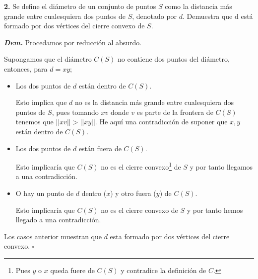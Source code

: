 \textbf{2.} Se define el diámetro de un conjunto de puntos $S$ como la distancia más grande
entre cualesquiera dos puntos de $S$, denotado por $d$. Demuestra que d está formado por dos
vértices del cierre convexo de $S$. \newline

\textbf{\textit{Dem.}} Procedamos por reducción al absurdo. \newline

Supongamos que el diámetro $C(S)$ no contiene dos puntos del diámetro, entonces, para $d = xy$;
\begin{itemize}
        \item Los dos puntos de $d$ están dentro de $C(S)$.
              
              Esto implica que $d$ no es la distancia más grande entre cualesquiera dos puntos
              de $S$, pues tomando $xv$ donde $v$ es parte de la frontera de $C(S)$ tenemos que
              $||xv|| > ||xy||$. He aquí una contradicción de suponer que $x, y$ están dentro de
              $C(S)$.
        \item Los dos puntos de $d$ están fuera de $C(S)$.
              
              Esto implicaría que $C(S)$ no es el cierre convexo\footnote{Pues $y$ o $x$ queda fuere de $C(S)$ y
              contradice la definición de $C$.} de $S$ y por tanto llegamos a una contradicción.
        \item O hay un punto de $d$ dentro ($x$) y otro fuera ($y$) de $C(S)$.
              
              Esto implicaría que $C(S)$ no es el cierre convexo de $S$ y por tanto hemos llegado a una contradicción.
\end{itemize}
Los casos anterior muestran que $d$ esta formado por dos vértices del cierre convexo. \hfill $\square$
